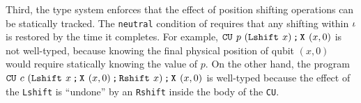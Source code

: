 Third, the type system enforces that the effect of position shifting
operations can be statically tracked. The \texttt{neutral} condition of
 requires that any shifting within $\iota$ is restored by the time it
completes. 
For example, ${\texttt{CU}^{ }~{p}~{(\texttt{Lshift}^{ }~{x})}}\,\texttt{;}\,{\texttt{X}^{ }~{(x,0)}}$ is not well-typed, because knowing the final physical position of qubit $(x,0)$ would require statically knowing the value of $p$. 
On the other hand, the program ${\texttt{CU}^{ }~{c}~{({\texttt{Lshift}^{ }~{x}}\,\texttt{;}\,{{\texttt{X}^{ }~{(x,0)}}\,\texttt{;}\,{\texttt{Rshift}^{ }~{x}}})}}\,\texttt{;}\,{\texttt{X}^{ }~{(x,0)}}$ is well-typed 
because the effect of the \texttt{Lshift} is ``undone'' by an \texttt{Rshift} inside the body of the \texttt{CU}.


\label{sec:pqasm-dsem}

